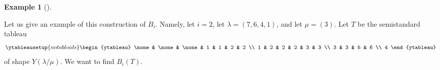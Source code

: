 \documentclass[numbers=enddot,12pt,final,onecolumn,notitlepage]{scrartcl}%
\theoremstyle{definition}
\newtheorem{exmp}[theo]{Example}
\newenvironment{example}[1][]
{\begin{exmp}[#1]\begin{leftbar}}
{\end{leftbar}\end{exmp}}
\begin{document}
\begin{example}
\label{exa.BKclassical}Let us give an example of this construction of $B_{i}$.
Namely, let $i=2$, let $\lambda=\left(  7,6,4,1\right)  $, and let
$\mu=\left(  3\right)  $. Let $T$ be the semistandard tableau%
\[%
\ytableausetup{notabloids}
\begin{ytableau}
\none& \none& \none& 1 & 1 & 2 & 2 \\
1 & 2 & 2 & 2 & 3 & 3 \\
3 & 3 & 5 & 6 \\
4
\end{ytableau}%
\]
of shape $Y\left(  \lambda/\mu\right)  $. We want to find $B_{i}\left(
T\right)  $.


\end{example}
\end{document}
